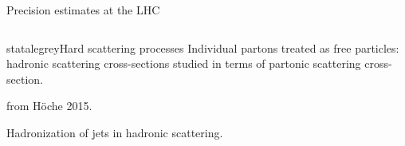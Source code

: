 \begin{frame}{Precision estimates at the LHC}
\begin{columns}
\begin{column}{0.5 \textwidth}
\begin{colorblock}[black]{statalegrey}{Hard scattering processes}
        Individual partons treated as free particles: hadronic scattering cross-sections studied in terms of partonic scattering cross-section.
      \end{colorblock}

      \vspace{0.5em}

       from Höche 2015.

      \justifying
      Hadronization of jets in hadronic scattering.

    \end{column}

  \end{columns}

\end{frame}


